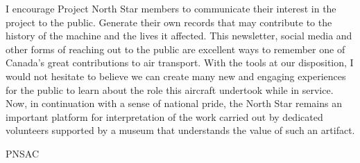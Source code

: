 I encourage Project North Star members to communicate their interest in the
project to the public. Generate their own records that may contribute to the
history of the machine and the lives it affected. This newsletter, social media
and other forms of reaching out to the public are excellent ways to remember
one of Canada's great contributions to air transport. With the tools at our
disposition, I would not hesitate to believe we can create many new and
engaging experiences for the public to learn about the role this aircraft
undertook while in service. Now, in continuation with a sense of national
pride, the North Star remains an important platform for interpretation of the
work carried out by dedicated volunteers supported by a museum that understands
the value of such an artifact. 

\begin{footnotesize}
  \raggedleft PNSAC\\
\end{footnotesize}



